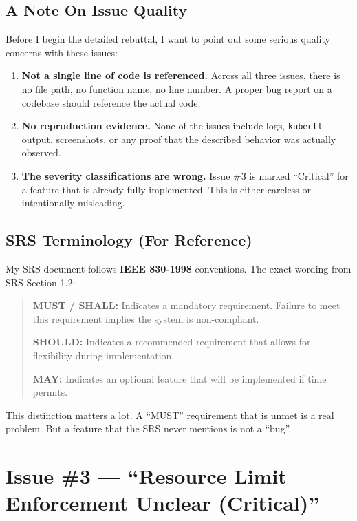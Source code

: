 \documentclass[12pt,a4paper]{article}
\begin{document}
\subsection{A Note On Issue Quality}

Before I begin the detailed rebuttal, I want to point out some serious quality concerns with these issues:

\begin{enumerate}
  \item \textbf{Not a single line of code is referenced.} Across all three issues, there is no file path, no function name, no line number. A proper bug report on a codebase should reference the actual code.
  \item \textbf{No reproduction evidence.} None of the issues include logs, \texttt{kubectl} output, screenshots, or any proof that the described behavior was actually observed.
  \item \textbf{The severity classifications are wrong.} Issue \#3 is marked ``Critical'' for a feature that is already fully implemented. This is either careless or intentionally misleading.
\end{enumerate}

\subsection{SRS Terminology (For Reference)}

My SRS document follows \textbf{IEEE 830-1998} conventions. The exact wording from SRS Section 1.2:

\begin{quote}
\textbf{MUST / SHALL:} Indicates a mandatory requirement. Failure to meet this requirement implies the system is non-compliant.

\textbf{SHOULD:} Indicates a recommended requirement that allows for flexibility during implementation.

\textbf{MAY:} Indicates an optional feature that will be implemented if time permits.
\end{quote}

This distinction matters a lot. A ``MUST'' requirement that is unmet is a real problem. But a feature that the SRS never mentions is not a ``bug''.

\newpage

\section{Issue \#3 --- ``Resource Limit Enforcement Unclear (Critical)''}
\end{document}
